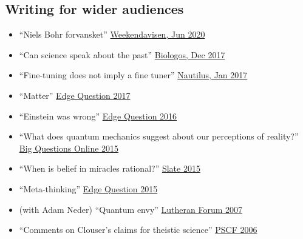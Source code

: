\documentclass[11pt]{article}
\begin{document}
\subsection*{Writing for wider audiences}

\begin{itemize}

\item ``Niels Bohr forvansket''
  \href{https://www.weekendavisen.dk/2020-23/ideer/debat}{Weekendavisen,
    Jun 2020}

\item ``Can science speak about the past''
  \href{https://biologos.org/blogs/guest/can-science-speak-about-the-past}{Biologos,
    Dec 2017}

\item ``Fine-tuning does not imply a fine tuner''
  \href{http://cosmos.nautil.us/short/119/fine-tuning-does-not-imply-a-fine-tuner}{Nautilus,
    Jan 2017}

\item ``Matter'' \href{https://www.edge.org/response-detail/27030}{Edge Question 2017}

\item ``Einstein was wrong'' \href{https://edge.org/response-detail/26748}{Edge Question 2016}

\item ``What does quantum mechanics suggest about our perceptions of
  reality?''
  \href{https://www.bigquestionsonline.com/content/what-does-quantum-mechanics-suggest-about-our-perceptions-reality}{Big
    Questions Online 2015}

\item ``When is belief in miracles rational?''
  \href{http://www.slate.com/bigideas/are-miracles-possible/essays-and-opinions/hans-halvorson-opinion}{Slate
    2015}

\item ``Meta-thinking'' \href{http://edge.org/response-detail/26188}{Edge Question 2015}

\item (with Adam Neder) ``Quantum envy''
  \href{http://www.lutheranforum.org/categories/archive/winter-2007/LF2007-4_55-57_Halvorson-Neder-Quantum_Envy.pdf}{Lutheran
    Forum 2007}

\item ``Comments on Clouser's claims for theistic science''
  \href{http://www.asa3.org/ASA/PSCF/2006/PSCF3-06Halvorson.pdf}{PSCF 2006}

\end{itemize}
\end{document}
